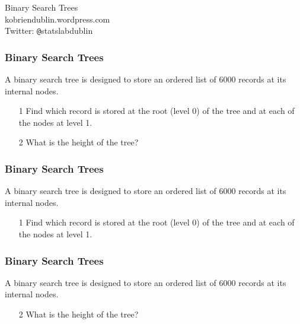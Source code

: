 \documentclass{beamer}
\begin{document}
\begin{frame}
\begin{center}
\Huge
Binary Search Trees\\

\bigskip
kobriendublin.wordpress.com\\
Twitter: \texttt{@}statslabdublin


\end{center}

\end{frame}

\begin{frame}
\frametitle{Binary Search Trees}
\LARGE
A binary search tree is designed to store an ordered list of 6000 records at its internal nodes.\\
\bigskip
\begin{itemize}
\item[1] Find which record is stored at the root (level 0) of the tree and at each
of the nodes at level 1.
\item[2]  What is the height of the tree?
\end{itemize}
\end{frame}
\begin{frame}
\frametitle{Binary Search Trees}
\Large
\vspace{-3cm}
A binary search tree is designed to store an ordered list of 6000 records at its internal nodes.\\
\bigskip
\begin{itemize}
\item[1] Find which record is stored at the root (level 0) of the tree and at each
of the nodes at level 1.

\end{itemize}
\end{frame}
\begin{frame}
\frametitle{Binary Search Trees}
\Large
\vspace{-3cm}
A binary search tree is designed to store an ordered list of 6000 records at its internal nodes.\\
\bigskip
\begin{itemize}
\item[2]  What is the height of the tree?
\end{itemize}
\end{frame}
\end{document}
